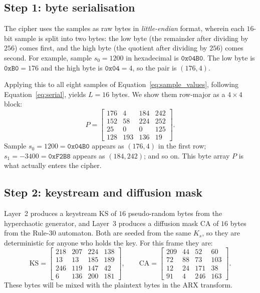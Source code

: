 \documentclass[pdflatex,sn-mathphys-num]{sn-jnl}%
\theoremstyle{thmstyleone}%
\theoremstyle{thmstyletwo}%
\theoremstyle{thmstylethree}%
\begin{document}
\subsection{Step 1: byte serialisation}

The cipher uses the samples as raw bytes in \emph{little-endian} format, wherein each $16$-bit sample is split into two bytes: the low byte (the remainder after dividing by $256$) comes first, and the high byte (the quotient after dividing by $256$) comes second. For example, sample $s_0=1200$ in hexadecimal is $\texttt{0x04B0}$. The low byte is $\texttt{0xB0}=176$ and the high byte is $\texttt{0x04}=4$, so the pair is $(176,4)$.

Applying this to all eight samples of Equation~\eqref{eq:sample_values}, following Equation~\eqref{eq:serial}, yields $L=16$ bytes. We show them row-major as a $4\times4$ block:
\begin{equation*}
P=\begin{bmatrix}176&4&184&242\\152&58&224&252\\25&0&0&125\\128&193&136&19\end{bmatrix}.
\end{equation*}
Sample $s_0=1200=\texttt{0x04B0}$ appears as $(176,4)$ in the first row; $s_1=-3400=\texttt{0xF2B8}$ appears as $(184,242)$; and so on. This byte array $P$ is what actually enters the cipher.

\subsection{Step 2: keystream and diffusion mask}

Layer~2 produces a keystream $\mathrm{KS}$ of $16$ pseudo-random bytes from the hyperchaotic generator, and Layer~3 produces a diffusion mask $\mathrm{CA}$ of $16$ bytes from the Rule-30 automaton. Both are seeded from the same $K_s$, so they are deterministic for anyone who holds the key. For this frame they are:
\begin{equation*}
\mathrm{KS}=\begin{bmatrix}218&207&224&138\\13&13&185&189\\246&119&147&42\\6&136&200&181\end{bmatrix},\qquad
\mathrm{CA}=\begin{bmatrix}209&44&52&60\\72&88&73&103\\12&24&171&38\\91&4&246&163\end{bmatrix}.
\end{equation*}
These bytes will be mixed with the plaintext bytes in the ARX transform.
\end{document}
